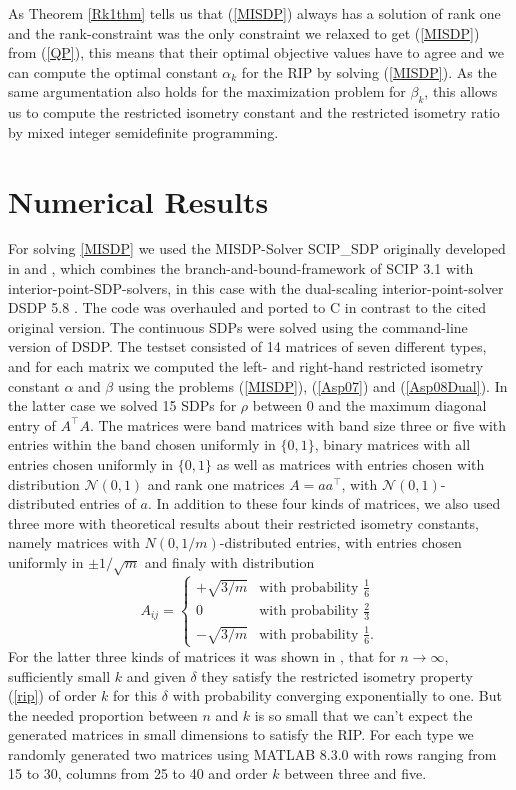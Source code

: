 \documentclass[a4paper,11pt,1p]{elsarticle}
\newcommand{\T}{^{\top}}
\begin{document}
As Theorem \ref{Rk1thm} tells us that (\ref{MISDP}) always has a solution of rank one and the rank-constraint was the only constraint we relaxed to get (\ref{MISDP}) from (\ref{QP}), this means that their optimal objective values 
have to agree and we can compute the optimal constant $\alpha_k$ for the RIP by solving (\ref{MISDP}). As the same argumentation also holds for the maximization problem for $\beta_k$, this allows us to compute the restricted isometry
constant and the restricted isometry ratio by mixed integer semidefinite programming.

\section{Numerical Results}
\label{sec:numerical_results}

For solving \ref{MISDP} we used the MISDP-Solver SCIP\_SDP originally developed in \cite{MS12} and \cite{Mar13}, which combines the branch-and-bound-framework of SCIP 3.1 \cite{SCIP} with interior-point-SDP-solvers, in this case 
with the dual-scaling interior-point-solver DSDP 5.8 \cite{DSDP}. The code was overhauled and ported to C in contrast to the cited original version. The continuous SDPs were solved using the command-line version of DSDP. The testset
consisted of 14 matrices of seven different types, and for each matrix we computed
the left- and right-hand restricted isometry constant $\alpha$ and $\beta$ using the problems (\ref{MISDP}), (\ref{Asp07}) and (\ref{Asp08Dual}). In the latter case we solved 15 SDPs for $\rho$ between $0$ and the maximum diagonal 
entry of $A\T A$. The matrices were band matrices with band size three or five with entries within the band chosen uniformly in $\{0,1\}$, binary matrices with all entries chosen uniformly in $\{0,1\}$ as well as matrices with 
entries chosen with distribution $\mathcal{N}(0,1)$ and rank one matrices $A = aa\T$, with $\mathcal{N}(0,1)$-distributed entries of $a$. In addition to these four kinds of matrices, we also used three more with theoretical results
about their restricted isometry constants, namely matrices with $N(0, 1/m)$-distributed entries, with entries chosen uniformly in $\pm 1/\sqrt{m}$ and finaly with distribution
\begin{equation}\nonumber
A_{ij} = \begin{cases} + \sqrt{3/m} & \text{with probability } \frac{1}{6} \\ 0 & \text{with probability } \frac{2}{3} \\ - \sqrt{3/m} & \text{with probability } \frac{1}{6}. \end{cases}
\end{equation}
For the latter three kinds of matrices it was shown in \cite{BDDW08}, that for $n \rightarrow \infty$, sufficiently small $k$ and given $\delta$ they satisfy the restricted isometry property (\ref{rip}) of order $k$ for this $\delta$
with probability converging exponentially to one. But the needed proportion between $n$ and $k$ is so small that we can't expect the generated matrices in small dimensions to satisfy the RIP. For each type we randomly generated two
matrices using MATLAB 8.3.0 \cite{MAT} with rows ranging from 15 to 30, columns from 25 to 40 and order $k$ between three and five.
\end{document}

